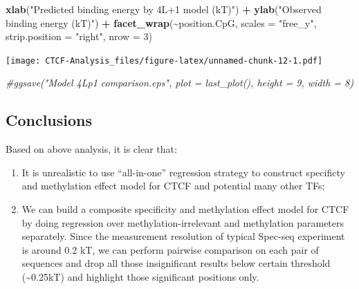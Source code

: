 \documentclass[
]{article}
\newenvironment{Shaded}{\begin{snugshade}}{\end{snugshade}}
\newcommand{\CommentTok}[1]{\textcolor[rgb]{0.56,0.35,0.01}{\textit{#1}}}
\newcommand{\DataTypeTok}[1]{\textcolor[rgb]{0.13,0.29,0.53}{#1}}
\newcommand{\DecValTok}[1]{\textcolor[rgb]{0.00,0.00,0.81}{#1}}
\newcommand{\KeywordTok}[1]{\textcolor[rgb]{0.13,0.29,0.53}{\textbf{#1}}}
\newcommand{\NormalTok}[1]{#1}
\newcommand{\OperatorTok}[1]{\textcolor[rgb]{0.81,0.36,0.00}{\textbf{#1}}}
\newcommand{\StringTok}[1]{\textcolor[rgb]{0.31,0.60,0.02}{#1}}
\begin{document}
\begin{Shaded}
\begin{Highlighting}[]
\StringTok{    }\KeywordTok{xlab}\NormalTok{(}\StringTok{"Predicted binding energy by 4L+1 model (kT)"}\NormalTok{) }\OperatorTok{+}
\StringTok{    }\KeywordTok{ylab}\NormalTok{(}\StringTok{"Observed binding energy (kT)"}\NormalTok{) }\OperatorTok{+}
\StringTok{    }\KeywordTok{facet\_wrap}\NormalTok{(}\OperatorTok{\textasciitilde{}}\NormalTok{position.CpG, }
               \DataTypeTok{scales =} \StringTok{"free\_y"}\NormalTok{,}
               \DataTypeTok{strip.position =} \StringTok{"right"}\NormalTok{,}
               \DataTypeTok{nrow =} \DecValTok{3}\NormalTok{)}
\end{Highlighting}
\end{Shaded}

\texttt{[image: CTCF-Analysis\_files/figure-latex/unnamed-chunk-12-1.pdf]}

\begin{Shaded}
\begin{Highlighting}[]
\CommentTok{\#ggsave("Model 4Lp1 comparison.eps", plot = last\_plot(), height = 9, width = 8)}
\end{Highlighting}
\end{Shaded}

\hypertarget{conclusions}{%
\subsection{Conclusions}\label{conclusions}}

Based on above analysis, it is clear that:

\begin{enumerate}
\def\labelenumi{\arabic{enumi})}
\item
  It is unrealistic to use ``all-in-one'' regression strategy to
  construct specificty and methylation effect model for CTCF and
  potential many other TFs;
\item
  We can build a composite specificity and methylation effect model for
  CTCF by doing regression over methylation-irrelevant and methylation
  parameters separately. Since the measurement resolution of typical
  Spec-seq experiment is around 0.2 kT, we can perform pairwise
  comparison on each pair of sequences and drop all those insignificant
  results below certain threshold (\textasciitilde0.25kT) and highlight
  those significant positions only.
\end{enumerate}
\end{document}
